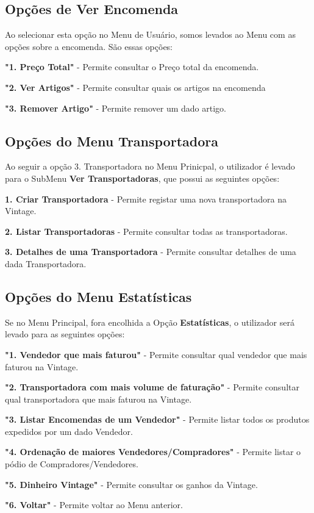 \documentclass[a4paper]{report}
\begin{document}
    \subsection{Opções de Ver Encomenda}
    Ao selecionar esta opção no Menu de Usuário, somos levados ao Menu com as opções sobre a encomenda. São essas opções:
    \par
    \textbf{"1. Preço Total"} - Permite consultar o Preço total da encomenda.
    \par
    \textbf{"2. Ver Artigos"} - Permite consultar quais os artigos na encomenda
    \par
    \textbf{"3. Remover Artigo"} - Permite remover um dado artigo.
    \par

    \subsection{Opções do Menu Transportadora}
    Ao seguir a opção 3. Transportadora no Menu Prinicpal, o utilizador é levado para o SubMenu \textbf{Ver Transportadoras}, que possui as seguintes opções:
    \par
    \textbf{1. Criar Transportadora} - Permite registar uma nova transportadora na Vintage.
    \par
    \textbf{2. Listar Transportadoras} - Permite consultar todas as transportadoras.
    \par
    \textbf{3. Detalhes de uma Transportadora} - Permite consultar detalhes de uma dada Transportadora.
    \par
    
    \subsection{Opções do Menu Estatísticas}
    Se no Menu Principal, fora encolhida a Opção \textbf{Estatísticas}, o utilizador será levado para as seguintes opções:
    \par
    \textbf{"1. Vendedor que mais faturou"} - Permite consultar qual vendedor que mais faturou na Vintage.
    \par
    \textbf{"2. Transportadora com mais volume de faturação"} - Permite consultar qual transportadora que mais faturou na Vintage.
    \par
    \textbf{"3. Listar Encomendas de um Vendedor"} - Permite listar todos os produtos expedidos por um dado Vendedor.
    \par
    \textbf{"4. Ordenação de maiores Vendedores/Compradores"} - Permite listar o pódio de Compradores/Vendedores.
    \par
    \textbf{"5. Dinheiro Vintage"} - Permite consultar os ganhos da Vintage.
    \par
    \textbf{"6. Voltar"} - Permite voltar ao Menu anterior.
    \par
\end{document}
